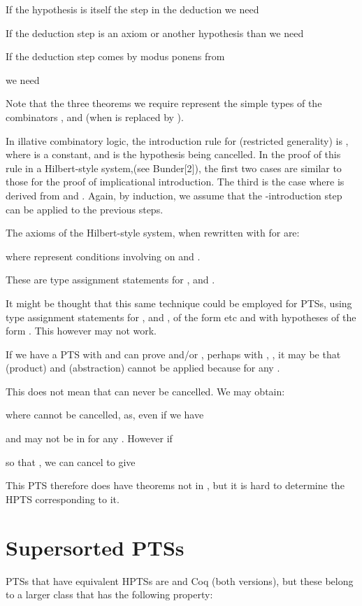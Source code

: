 \documentclass{LMCS}
\begin{document}
\begin{thm}
{  If the hypothesis  is itself the step in the deduction we need

  If the deduction step is an axiom or another hypothesis than  we need

  If the deduction step comes  by modus ponens from

  we need 


  Note that the three theorems we require represent the simple types
  of the combinators ,  and  (when
   is replaced by ).

  In illative combinatory logic, the introduction rule for 
  (restricted generality) is , where  is a constant,  and  is the hypothesis being cancelled. In the
  proof of this rule in a Hilbert-style system,(see Bunder[2]), the
  first two cases are similar to those for the proof of implicational
  introduction. The third is the case where  is
  derived from  and .
  Again, by induction, we assume that the -introduction step can
  be applied to the previous steps.

  The axioms of the Hilbert-style system, when rewritten with  for 
  are:

  where  represent conditions involving  on  and
  .

  These are type assignment statements for ,  and
  .

  It might be thought that this same technique could be employed for
  PTSs, using type assignment statements for ,  and
  , of the form  etc and with hypotheses of the form .  This however may
  not work.

  If we have a PTS with  and can prove  and/or , perhaps with ,
  , it may be that (product) and (abstraction) cannot be
  applied because  for any .

  This does not mean that  can never be cancelled. We may
  obtain:

  where  cannot be cancelled, as, even if we have

   and  may not be in 
  for any . However if

  so that , we can cancel  to give


  This PTS therefore does have theorems not in , but it
  is hard to determine the HPTS corresponding to it.

\section{Supersorted PTSs}\label{S:SupSort}

 \noindent PTSs that have equivalent HPTSs are  and
  Coq (both versions), but these belong to a larger class
  that has the following property{:}

}
\end{thm}
\end{document}
